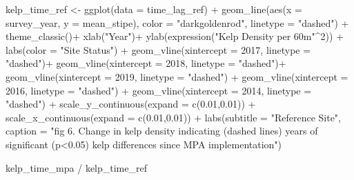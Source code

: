 \documentclass[
]{article}
\newenvironment{Shaded}{\begin{snugshade}}{\end{snugshade}}
\newcommand{\AttributeTok}[1]{\textcolor[rgb]{0.77,0.63,0.00}{#1}}
\newcommand{\DecValTok}[1]{\textcolor[rgb]{0.00,0.00,0.81}{#1}}
\newcommand{\FloatTok}[1]{\textcolor[rgb]{0.00,0.00,0.81}{#1}}
\newcommand{\FunctionTok}[1]{\textcolor[rgb]{0.00,0.00,0.00}{#1}}
\newcommand{\NormalTok}[1]{#1}
\newcommand{\OtherTok}[1]{\textcolor[rgb]{0.56,0.35,0.01}{#1}}
\newcommand{\SpecialCharTok}[1]{\textcolor[rgb]{0.00,0.00,0.00}{#1}}
\newcommand{\StringTok}[1]{\textcolor[rgb]{0.31,0.60,0.02}{#1}}
\begin{document}
\begin{Shaded}
\begin{Highlighting}[]
\NormalTok{kelp\_time\_ref }\OtherTok{\textless{}{-}} \FunctionTok{ggplot}\NormalTok{(}\AttributeTok{data =}\NormalTok{ time\_lag\_ref) }\SpecialCharTok{+}
  \FunctionTok{geom\_line}\NormalTok{(}\FunctionTok{aes}\NormalTok{(}\AttributeTok{x =}\NormalTok{ survey\_year, }\AttributeTok{y =}\NormalTok{ mean\_stipe), }
            \AttributeTok{color =} \StringTok{"darkgoldenrod"}\NormalTok{, }\AttributeTok{linetype =} \StringTok{"dashed"}\NormalTok{) }\SpecialCharTok{+}
  \FunctionTok{theme\_classic}\NormalTok{()}\SpecialCharTok{+}
  \FunctionTok{xlab}\NormalTok{(}\StringTok{"Year"}\NormalTok{)}\SpecialCharTok{+}
  \FunctionTok{ylab}\NormalTok{(}\FunctionTok{expression}\NormalTok{(}\StringTok{"Kelp Density per 60m"}\SpecialCharTok{\^{}}\DecValTok{2}\NormalTok{)) }\SpecialCharTok{+}
  \FunctionTok{labs}\NormalTok{(}\AttributeTok{color =} \StringTok{"Site Status"}\NormalTok{) }\SpecialCharTok{+}
  \FunctionTok{geom\_vline}\NormalTok{(}\AttributeTok{xintercept =} \DecValTok{2017}\NormalTok{, }\AttributeTok{linetype =} \StringTok{"dashed"}\NormalTok{)}\SpecialCharTok{+}
  \FunctionTok{geom\_vline}\NormalTok{(}\AttributeTok{xintercept =} \DecValTok{2018}\NormalTok{, }\AttributeTok{linetype =} \StringTok{"dashed"}\NormalTok{)}\SpecialCharTok{+}
  \FunctionTok{geom\_vline}\NormalTok{(}\AttributeTok{xintercept =} \DecValTok{2019}\NormalTok{, }\AttributeTok{linetype =} \StringTok{"dashed"}\NormalTok{) }\SpecialCharTok{+}
  \FunctionTok{geom\_vline}\NormalTok{(}\AttributeTok{xintercept =} \DecValTok{2016}\NormalTok{, }\AttributeTok{linetype =} \StringTok{"dashed"}\NormalTok{) }\SpecialCharTok{+}
  \FunctionTok{geom\_vline}\NormalTok{(}\AttributeTok{xintercept =} \DecValTok{2014}\NormalTok{, }\AttributeTok{linetype =} \StringTok{"dashed"}\NormalTok{) }\SpecialCharTok{+}
  \FunctionTok{scale\_y\_continuous}\NormalTok{(}\AttributeTok{expand =} \FunctionTok{c}\NormalTok{(}\FloatTok{0.01}\NormalTok{,}\FloatTok{0.01}\NormalTok{)) }\SpecialCharTok{+}
  \FunctionTok{scale\_x\_continuous}\NormalTok{(}\AttributeTok{expand =} \FunctionTok{c}\NormalTok{(}\FloatTok{0.01}\NormalTok{,}\FloatTok{0.01}\NormalTok{)) }\SpecialCharTok{+}
  \FunctionTok{labs}\NormalTok{(}\AttributeTok{subtitle =} \StringTok{"Reference Site"}\NormalTok{,}
       \AttributeTok{caption =} \StringTok{"fig 6. Change in kelp density indicating (dashed lines) years of significant (p\textless{}0.05) kelp differences since MPA implementation"}\NormalTok{) }

\NormalTok{kelp\_time\_mpa }\SpecialCharTok{/}\NormalTok{ kelp\_time\_ref}
\end{Highlighting}
\end{Shaded}
\end{document}
